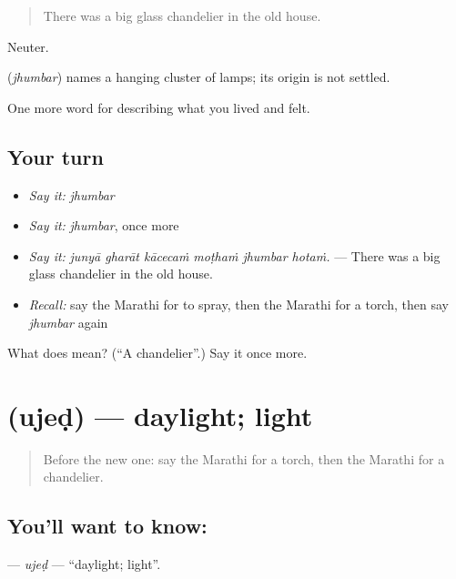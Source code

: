 \begin{quote}
There was a big glass chandelier in the old house.
\end{quote}

Neuter.

\begin{cousinweb}
\textbf{} (\emph{jhumbar}) names a hanging cluster of lamps; its origin is not settled.
\end{cousinweb}

\begin{grammarlens}[title={What you've built}]
One more word for describing what you lived and felt.
\end{grammarlens}

\subsection*{Your turn}
\begin{itemize}
\raggedright
  \item \emph{Say it:} \emph{jhumbar}
  \item \emph{Say it:} \emph{jhumbar}, once more
  \item \emph{Say it:} \emph{junyā gharāt kācecaṁ moṭhaṁ jhumbar hotaṁ.} — There was a big glass chandelier in the old house.
  \item \emph{Recall:} say the Marathi for to spray, then the Marathi for a torch, then say \emph{jhumbar} again
\end{itemize}

\begin{tcolorbox}[breakable,colback=teal!4,colframe=teal!35!black,title={Before you move on}]
What does  mean? (\textquotedblleft{}A chandelier\textquotedblright{}.) Say it once more.
\end{tcolorbox}
\section[\texorpdfstring{\mr{उजेड} (ujeḍ)}{उजेड (ujeḍ)}]{ (ujeḍ) — daylight; light}

\label{lesson:MR-C519-ujed}



\begin{quote}
Before the new one: say the Marathi for a torch, then the Marathi for a chandelier.
\end{quote}

\subsection*{You'll want to know: }
\textbf{} — \emph{ujeḍ} — \textquotedblleft{}daylight; light\textquotedblright{}.

